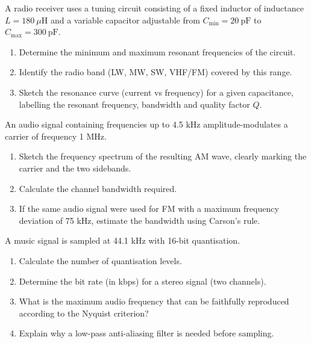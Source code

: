 \documentclass[11pt]{article}
\newcounter{popsec}
\newcounter{popsub}
\newcommand{\courssub}[1]{%
  \stepcounter{popsub}%
  \par\vspace{9pt}\noindent{\popxbold\fontsize{11.5}{13}\selectfont\color{popink}{\color{poporange}\thepopsec.\thepopsub}\hspace{6pt}#1}\par\nopagebreak\vspace{4pt}
}
\begin{document}
\begin{exercice}
A radio receiver uses a tuning circuit consisting of a fixed inductor of inductance $L = 180\ \mu\mathrm{H}$ and a variable capacitor adjustable from $C_{\min} = 20\ \mathrm{pF}$ to $C_{\max} = 300\ \mathrm{pF}$.
\begin{enumerate}
\item Determine the minimum and maximum resonant frequencies of the circuit.
\item Identify the radio band (LW, MW, SW, VHF/FM) covered by this range.
\item Sketch the resonance curve (current vs frequency) for a given capacitance, labelling the resonant frequency, bandwidth and quality factor $Q$.
\end{enumerate}
\end{exercice}

\begin{exercice}
An audio signal containing frequencies up to 4.5 kHz amplitude-modulates a carrier of frequency 1 MHz.
\begin{enumerate}
\item Sketch the frequency spectrum of the resulting AM wave, clearly marking the carrier and the two sidebands.
\item Calculate the channel bandwidth required.
\item If the same audio signal were used for FM with a maximum frequency deviation of 75 kHz, estimate the bandwidth using Carson's rule.
\end{enumerate}
\end{exercice}

\begin{exercice}
A music signal is sampled at 44.1 kHz with 16-bit quantisation.
\begin{enumerate}
\item Calculate the number of quantisation levels.
\item Determine the bit rate (in kbps) for a stereo signal (two channels).
\item What is the maximum audio frequency that can be faithfully reproduced according to the Nyquist criterion?
\item Explain why a low-pass anti-aliasing filter is needed before sampling.
\end{enumerate}
\end{exercice}

\courssub{I prepare for the GCE}
\end{document}
